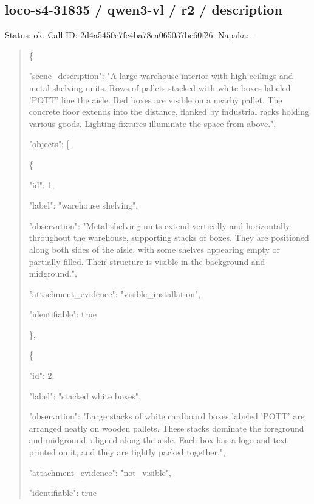 \documentclass[10pt,a4paper]{article}
\begin{document}
\subsection*{loco-s4-31835 / qwen3-vl / r2 / description}
Status: ok. Call ID: 2d4a5450e7fc4ba78ca065037be60f26. Napaka: --
\begin{quote}\footnotesize
\{\par
  "scene\_description":\allowbreak{} "A large warehouse interior with high ceilings and metal shelving units. Rows of pallets stacked with white boxes labeled 'POTT' line the aisle. Red boxes are visible on a nearby pallet. The concrete floor extends into the distance,\allowbreak{} flanked by industrial racks holding various goods. Lighting fixtures illuminate the space from above.",\allowbreak{}\par
  "objects":\allowbreak{} [\par
    \{\par
      "id":\allowbreak{} 1,\allowbreak{}\par
      "label":\allowbreak{} "warehouse shelving",\allowbreak{}\par
      "observation":\allowbreak{} "Metal shelving units extend vertically and horizontally throughout the warehouse,\allowbreak{} supporting stacks of boxes. They are positioned along both sides of the aisle,\allowbreak{} with some shelves appearing empty or partially filled. Their structure is visible in the background and midground.",\allowbreak{}\par
      "attachment\_evidence":\allowbreak{} "visible\_installation",\allowbreak{}\par
      "identifiable":\allowbreak{} true\par
    \},\allowbreak{}\par
    \{\par
      "id":\allowbreak{} 2,\allowbreak{}\par
      "label":\allowbreak{} "stacked white boxes",\allowbreak{}\par
      "observation":\allowbreak{} "Large stacks of white cardboard boxes labeled 'POTT' are arranged neatly on wooden pallets. These stacks dominate the foreground and midground,\allowbreak{} aligned along the aisle. Each box has a logo and text printed on it,\allowbreak{} and they are tightly packed together.",\allowbreak{}\par
      "attachment\_evidence":\allowbreak{} "not\_visible",\allowbreak{}\par
      "identifiable":\allowbreak{} true\par

\end{quote}
\end{document}
